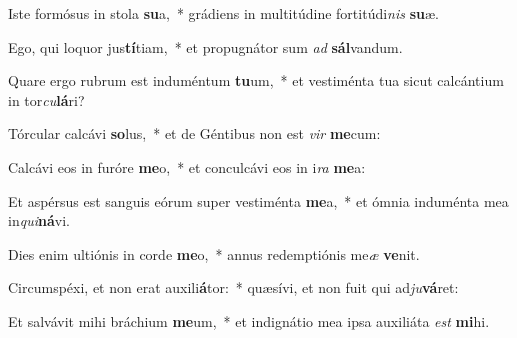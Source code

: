 \item Iste formósus in stola \textbf{su}a,~* grádiens in multitúdine fortitúdi\textit{nis} \textbf{su}æ.
\item Ego, qui loquor jus\textbf{tí}tiam,~* et propugnátor sum \textit{ad} \textbf{sál}vandum.
\item Quare ergo rubrum est induméntum \textbf{tu}um,~* et vestiménta tua sicut calcántium in tor\textit{cu}\textbf{lá}ri?
\item Tórcular calcávi \textbf{so}lus,~* et de Géntibus non est \textit{vir} \textbf{me}cum:
\item Calcávi eos in furóre \textbf{me}o,~* et conculcávi eos in i\textit{ra} \textbf{me}a:
\item Et aspérsus est sanguis eórum super vestiménta \textbf{me}a,~* et ómnia induménta mea in\textit{qui}\textbf{ná}vi.
\item Dies enim ultiónis in corde \textbf{me}o,~* annus redemptiónis me\textit{æ} \textbf{ve}nit.
\item Circumspéxi, et non erat auxili\textbf{á}tor:~* quæsívi, et non fuit qui ad\textit{ju}\textbf{vá}ret:
\item Et salvávit mihi bráchium \textbf{me}um,~* et indignátio mea ipsa auxiliáta \textit{est} \textbf{mi}hi.
